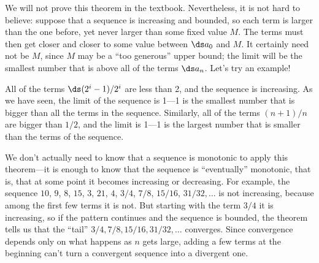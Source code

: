 \documentclass{ximera}
\begin{document}

We will not prove this theorem in the textbook. Nevertheless,
it is not hard to believe: suppose that a sequence is increasing and
bounded, so each term is larger than the one before, yet never larger
than some fixed value $M$. The terms must then get closer and closer
to some value between $\ds a_0$ and $M$. It certainly need not be $M$,
since $M$ may be a ``too generous'' upper bound; the limit will be the
smallest number that is above all of the terms
$\ds a_n$.  Let's try an example!

\begin{example}
  \label{example:sequence-bounded}
  All of the terms $\ds (2^i-1)/2^i$ are less than 2, and the sequence
  is increasing.  As we have seen, the limit of the sequence is 1---1
  is the smallest number that is bigger than all the terms in the
  sequence.  Similarly, all of the terms $(n+1)/n$ are bigger than
  $1/2$, and the limit is 1---1 is the largest number that is smaller
  than the terms of the sequence.
\end{example}


We don't actually need to know that a sequence is monotonic to apply
this theorem---it is enough to know that the sequence is
``eventually'' monotonic,
that is, that at some point it becomes increasing or decreasing.  For
example, the sequence $10$, $9$, $8$, $15$, $3$, $21$, $4$, $3/4$,
$7/8$, $15/16$, $31/32,\ldots$ is not increasing, because among the
first few terms it is not. But starting with the term $3/4$ it is
increasing, so if the pattern continues and the sequence is bounded,
the theorem tells us that the ``tail'' $3/4, 7/8, 15/16, 31/32,\ldots$
converges.  Since convergence depends only on what happens as $n$ gets
large, adding a few terms at the beginning can't turn a convergent
sequence into a divergent one.
\end{document}
